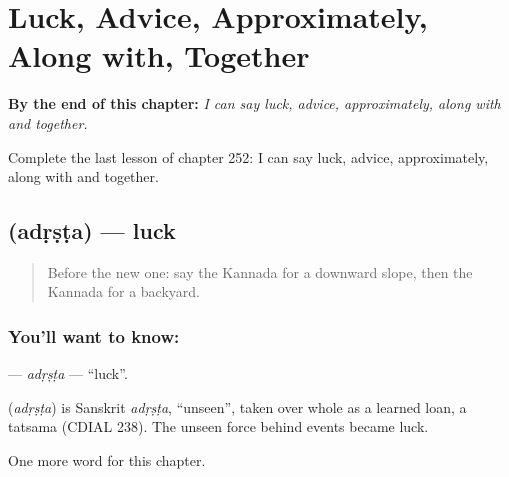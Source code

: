 
\chapter{Luck, Advice, Approximately, Along with, Together}
\label{ch:ka-luck-advice-approximately-along-with-together}

\begin{chapteropening}
\textbf{By the end of this chapter:} \emph{I can say luck, advice, approximately, along with and together.}

Complete the last lesson of chapter 252: I can say luck, advice, approximately, along with and together.
\end{chapteropening}

\section[\texorpdfstring{\kn{ಅದೃಷ್ಟ} (adṛṣṭa)}{ಅದೃಷ್ಟ (adṛṣṭa)}]{ (adṛṣṭa) — luck}

\label{lesson:KA-C252-adrsta}



\begin{quote}
Before the new one: say the Kannada for a downward slope, then the Kannada for a backyard.
\end{quote}

\subsection*{You'll want to know: }
\textbf{} — \emph{adṛṣṭa} — \textquotedblleft{}luck\textquotedblright{}.

\begin{cousinweb}
\textbf{} (\emph{adṛṣṭa}) is Sanskrit \emph{adṛṣṭa}, \textquotedblleft{}unseen\textquotedblright{}, taken over whole as a learned loan, a tatsama (CDIAL 238). The unseen force behind events became luck.
\end{cousinweb}

\begin{grammarlens}[title={What you've built}]
One more word for this chapter.
\end{grammarlens}

